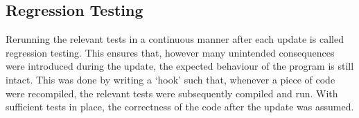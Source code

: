 \subsection{Regression Testing}
\label{sec:RegressionTesting}

Rerunning the relevant tests in a continuous manner after each update is called regression testing. This ensures that, however many unintended consequences were introduced during the update, the expected behaviour of the program is still intact. This was done by writing a `hook' such that, whenever a piece of code were recompiled, the relevant tests were subsequently compiled and run. With sufficient tests in place, the correctness of the code after the update was assumed.


